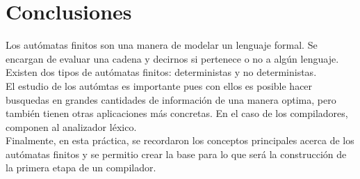 \section{Conclusiones}

Los autómatas finitos son una manera de modelar un lenguaje formal. Se encargan de evaluar una cadena y decirnos si pertenece o no a algún lenguaje. Existen dos tipos de autómatas finitos: deterministas y no deterministas. \\

El estudio de los autómtas es importante pues con ellos es posible hacer busquedas en grandes cantidades de información de una manera optima, pero también tienen otras aplicaciones más concretas. En el caso de los compiladores, componen al analizador léxico. \\

Finalmente, en esta práctica, se recordaron los conceptos principales acerca de los autómatas finitos y se permitio crear la base para lo que será la construcción de la primera etapa de un compilador.





